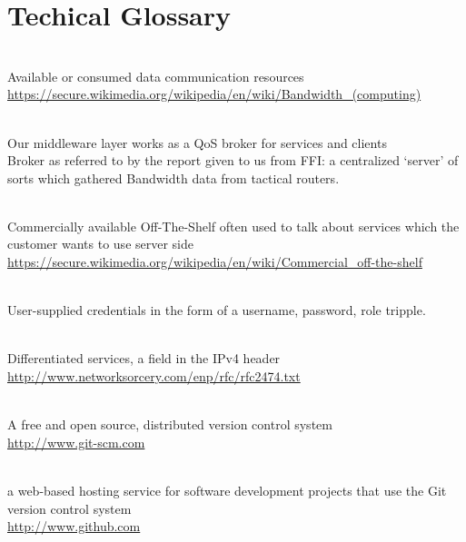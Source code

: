 \section{Techical Glossary}\label{Techical Glossary}
\begin{description}\label{glossary}

\item[Bandwidth]\label{glossary:bandwidth} \hfill\\
Available or consumed data communication resources \\ \url{https://secure.wikimedia.org/wikipedia/en/wiki/Bandwidth_(computing)}

\item[Broker]\label{glossary:broker} \hfill\\
Our middleware layer works as a QoS broker for services and clients \\
Broker as referred to by the report given to us from FFI: a centralized ‘server’ of sorts which gathered Bandwidth data from tactical routers.

\item[COTS]\label{glossary:cots} \hfill\\
Commercially available Off-The-Shelf often used to talk about services which the customer wants to use server side \\ \url{https://secure.wikimedia.org/wikipedia/en/wiki/Commercial_off-the-shelf}

\item[Credentials]\label{glossary:credentials} \hfill\\
User-supplied credentials in the form of a username, password, role tripple.

\item[DiffServ]\label{glossary:diffserv} \hfill\\
Differentiated services, a field in the IPv4 header \\ \url{http://www.networksorcery.com/enp/rfc/rfc2474.txt}

\item[Git]\label{glossary:git} \hfill\\
A free and open source, distributed version control system \\ \url{http://www.git-scm.com}

\item[Github]\label{glossary:github} \hfill\\
a web-based hosting service for software development projects that use the Git version control system \\ \url{http://www.github.com}


\end{description}
